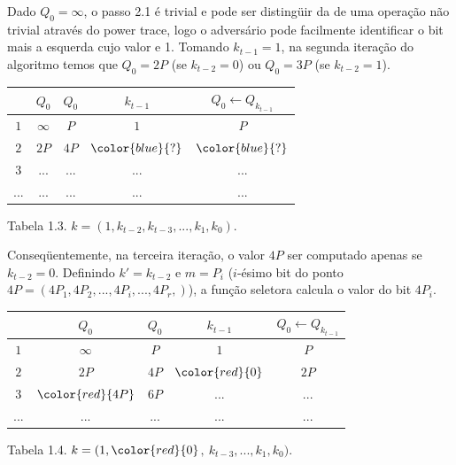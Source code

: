Dado $Q_{0} = \infty$, o passo 2.1 \'{e} trivial e pode ser disting\"{u}ir da de uma opera\c{c}\~{a}o n\~{a}o trivial
atrav\'{e}s do power trace, logo o advers\'{a}rio pode facilmente identificar o bit mais a esquerda cujo valor e 1. Tomando $k_{t-1}= 1$, na segunda itera\c{c}\~{a}o do algoritmo temos que $Q_{0} = 2P$ (se $k_{t-2} = 0$) ou $Q_{0} = 3P$ (se $k_{t-2} = 1$).

\begin{center}
    \begin{tabular}{|c|c|c|c|c|}
	    \hline
		    \   & $Q_{0}$  & $Q_{0}$ & $k_{t-1}$ & $Q_{0} \leftarrow Q_{k_{t-1}}$\\
	    \hline
	        $1$ & $\infty$ &     $P$ &       $1$ & $P$\\
	    \hline
		    $2$ & $2P$ & $4P$ & $\color{blue}{?}$ & $\color{blue}{?}$ \\
	    \hline
		    $3$ & ... & ... & ...& ... \\
	    \hline
		    ... & ... & ... & ...& ... \\
	    \hline
    \end{tabular}

    Tabela 1.3. $k = (1, k_{t-2}, k_{t-3}, ..., k_{1}, k_{0})$.
\end{center}

Conseq\"{u}entemente, na terceira itera\c{c}\~{a}o, o valor $4P$ ser computado apenas se $k_{t-2} = 0$. Definindo $k' = k_{t-2}$ e $m = P_{i}$ ($i$-\'{e}simo bit do ponto $4P = (4P_{1} , 4P_{2} , ..., 4P_{i} , ..., 4P_{r} , )$), a fun\c{c}\~{a}o seletora calcula o valor do bit $4P_{i}$.

\begin{center}
    \begin{tabular}{|c|c|c|c|c|}
	    \hline
		    \   & $Q_{0}$  & $Q_{0}$ & $k_{t-1}$ & $Q_{0} \leftarrow Q_{k_{t-1}}$\\
	    \hline
	        $1$ & $\infty$ &     $P$ &       $1$ & $P$\\
	    \hline
		    $2$ & $2P$ & $4P$ & $\color{red}{0}$ & $2P$ \\
	    \hline
		    $3$ & $\color{red}{4P}$ & $6P$ & ...& ... \\
	    \hline
		    ... & ... & ... & ...& ... \\
	    \hline
    \end{tabular}

    Tabela 1.4. $k = (1, \color{red}{0}$$,\ $$k_{t-3}, ..., k_{1}, k_{0})$.
\end{center}

